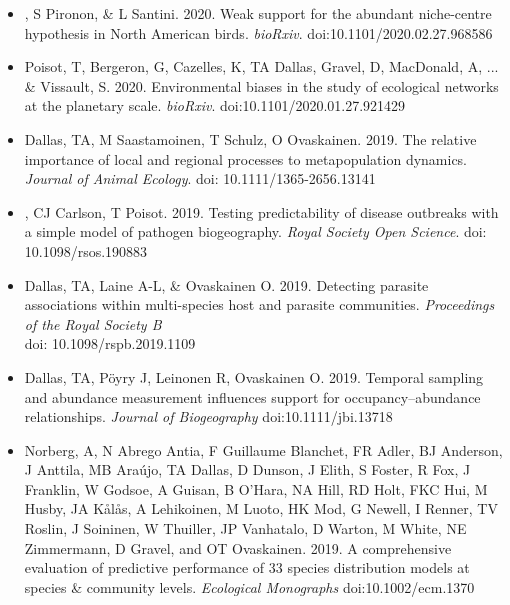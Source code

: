 \documentclass[]{CV}
\begin{document}
\begin{itemize}
\item {}, S Pironon, \& L Santini. 2020. Weak support for the abundant niche-centre hypothesis in North American birds. \textit{bioRxiv}. doi:10.1101/2020.02.27.968586

\item \OA Poisot, T, Bergeron, G, Cazelles, K, {\mefont TA Dallas}, Gravel, D, MacDonald, A, ... \& Vissault, S. 2020. Environmental biases in the study of ecological networks at the planetary scale. \textit{bioRxiv}. doi:10.1101/2020.01.27.921429

\end{itemize}





{}

\begin{itemize}

	\item {\mefont Dallas, TA},  M Saastamoinen, T Schulz, O Ovaskainen. 2019. The relative importance of local and regional processes to metapopulation dynamics. \textit{Journal of Animal Ecology}. doi: 10.1111/1365-2656.13141 

	\item {}, CJ Carlson, T Poisot. 2019. Testing predictability of disease outbreaks with a simple model of pathogen biogeography. \textit{Royal Society Open Science}. doi: 10.1098/rsos.190883

	\item {\mefont Dallas, TA}, Laine A-L, \& Ovaskainen O. 2019. Detecting parasite associations within multi-species host and parasite communities. \textit{Proceedings of the Royal Society B} \\ doi: 10.1098/rspb.2019.1109

	\item {\mefont Dallas, TA}, P{\"o}yry J, Leinonen R, Ovaskainen O. 2019. Temporal sampling and abundance measurement influences support for occupancy–abundance relationships. \textit{Journal of Biogeography} doi:10.1111/jbi.13718​

  \item Norberg, A, N Abrego Antia, F Guillaume Blanchet, FR Adler, BJ Anderson, J Anttila, MB Araújo, {\mefont TA Dallas}, D Dunson, J Elith, S Foster, R Fox, J Franklin, W Godsoe, A Guisan, B O'Hara, NA Hill, RD Holt, FKC Hui, M Husby, JA Kålås, A Lehikoinen, M Luoto, HK Mod, G Newell, I Renner, TV Roslin, J Soininen, W Thuiller, JP Vanhatalo, D Warton, M White, NE Zimmermann, D Gravel, and OT Ovaskainen. 2019. A comprehensive evaluation of predictive performance of 33 species distribution models at species \& community levels. \textit{Ecological Monographs} doi:10.1002/ecm.1370
    

\end{itemize}
\end{document}
